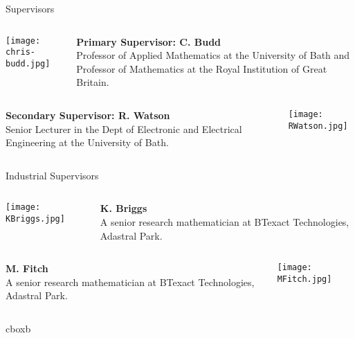 \documentclass[final]{beamer}
\theoremstyle{plain}
\theoremstyle{definition}
\theoremstyle{remark}
\newlength{\onecolwid}
\begin{document}
\begin{frame}[t]
\begin{columns}[t]
\begin{column}{\onecolwid}
\begin{block}{Supervisors}
\vspace{-2cm}
\begin{columns}
\begin{column}{0.25\linewidth}
\texttt{[image: chris-budd.jpg]}
\end{column}
\begin{column}{0.75\linewidth}
\textbf{Primary Supervisor: C. Budd}
 \\
Professor of Applied Mathematics at the University of Bath and Professor of Mathematics at the Royal Institution of Great Britain. \\
\end{column}
\end{columns}
\vspace{1cm}
\begin{columns}
\begin{column}{0.75\linewidth}
\textbf{Secondary Supervisor: R. Watson}
 \\
Senior Lecturer in the Dept of Electronic and Electrical Engineering at the University of Bath. \\
\end{column}
\begin{column}{0.25\linewidth}
\texttt{[image: RWatson.jpg]}
\end{column}
\end{columns}
\end{block}

\begin{alertblock}{Industrial Supervisors}

\begin{columns}
\begin{column}{0.24\linewidth}
\texttt{[image: KBriggs.jpg]}
\end{column}
\begin{column}{0.74\linewidth}
\textbf{K. Briggs}
 \\
A senior research mathematician at BTexact Technologies, Adastral Park. \\
\end{column}
\end{columns}
\begin{columns}
\begin{column}{0.7\linewidth}
\textbf{M. Fitch}
 \\
A senior research mathematician at BTexact Technologies, Adastral Park. \\
\end{column}
\begin{column}{0.24\linewidth}
\texttt{[image: MFitch.jpg]}
\end{column}
\end{columns}
\end{alertblock}
 \hspace{0.5in}
 \begin{beamercolorbox}[wd=10in,colsep=0.15cm]{cboxb}
 \end{beamercolorbox}
 \vspace{0.1in}




\end{column}
\end{columns}
\end{frame}
\end{document}
